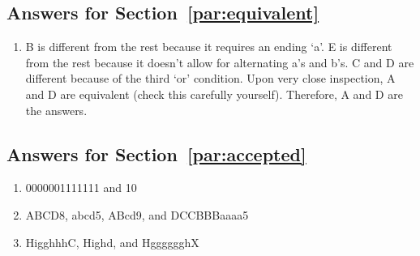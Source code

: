 \documentclass{pset_template}
\begin{document}
\subsection{Answers for Section~\ref{par:equivalent}}
\begin{enumerate}
\item B is different from the rest because it requires an ending `a'.
E is different from the rest because it doesn't allow for alternating a's and b's.
C and D are different because of the third `or' condition.
Upon very close inspection, A and D are equivalent (check this carefully yourself).
Therefore, A and D are the answers.
\end{enumerate}

\subsection{Answers for Section~\ref{par:accepted}}
\begin{enumerate}
\item 0000001111111 and 10
\item ABCD8, abcd5, ABcd9, and DCCBBBaaaa5
\item HigghhhC, Highd, and HgggggghX
\end{enumerate}
\end{document}
